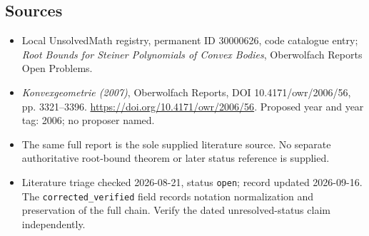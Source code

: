 \documentclass[11pt]{article}
\begin{document}
\subsection{Sources}
\begin{itemize}\item Local UnsolvedMath registry, permanent ID 30000626, code catalogue entry; \emph{Root Bounds for Steiner Polynomials of Convex Bodies}, Oberwolfach Reports Open Problems.\item \emph{Konvexgeometrie (2007)}, Oberwolfach Reports, DOI 10.4171/owr/2006/56, pp. 3321--3396. \url{https://doi.org/10.4171/owr/2006/56}. Proposed year and year tag: 2006; no proposer named.\item The same full report is the sole supplied literature source. No separate authoritative root-bound theorem or later status reference is supplied.\item Literature triage checked 2026-08-21, status \texttt{open}; record updated 2026-09-16. The \texttt{corrected\_verified} field records notation normalization and preservation of the full chain. Verify the dated unresolved-status claim independently.\end{itemize}
\end{document}
